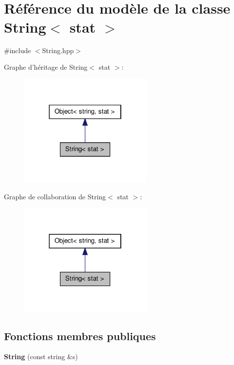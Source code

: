 \hypertarget{class_string}{\section{Référence du modèle de la classe String$<$ stat $>$}
\label{class_string}
}


{\ttfamily \#include $<$String.\-hpp$>$}



Graphe d'héritage de String$<$ stat $>$\-:\nopagebreak
\begin{figure}[H]
\begin{center}
\leavevmode
\includegraphics[width=190pt]{class_string__inherit__graph}
\end{center}
\end{figure}


Graphe de collaboration de String$<$ stat $>$\-:\nopagebreak
\begin{figure}[H]
\begin{center}
\leavevmode
\includegraphics[width=190pt]{class_string__coll__graph}
\end{center}
\end{figure}
\subsection*{Fonctions membres publiques}
\begin{DoxyCompactItemize}
\item 
\hypertarget{class_string_abaa192ded1017246ee096d6a52c916a4}{{\bfseries String} (const string \&s)}\label{class_string_abaa192ded1017246ee096d6a52c916a4}

\end{DoxyCompactItemize}
